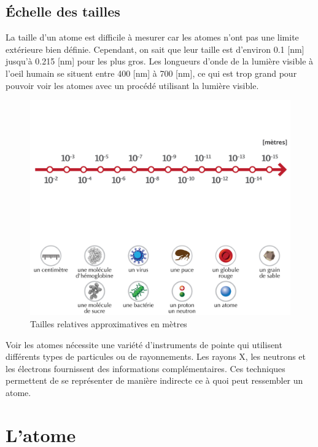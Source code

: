 \documentclass[
  11pt,
  a4paper,
  openany]{book}
\begin{document}
\hypertarget{uxe9chelle-des-tailles}{%
\section{Échelle des tailles}\label{uxe9chelle-des-tailles}}

La taille d'un atome est difficile à mesurer car les atomes n'ont pas une limite extérieure bien définie. Cependant, on sait que leur taille est d'environ 0.1 {[}nm{]} jusqu'à 0.215 {[}nm{]} pour les plus gros. Les longueurs d'onde de la lumière visible à l'oeil humain se situent entre 400 {[}nm{]} à 700 {[}nm{]}, ce qui est trop grand pour pouvoir voir les atomes avec un procédé utilisant la lumière visible.

\begin{figure}

{\centering \includegraphics[width=1\linewidth]{images/ordre-grandeur-ex} 

}

\caption{Tailles relatives approximatives en mètres}\label{fig:ordre-grandeur-ex}
\end{figure}

Voir les atomes nécessite une variété d'instruments de pointe qui utilisent différents types de particules ou de rayonnements. Les rayons X, les neutrons et les électrons fournissent des informations complémentaires. Ces techniques permettent de se représenter de manière indirecte ce à quoi peut ressembler un atome.

\hypertarget{latome}{%
\chapter{L'atome}\label{latome}}
\end{document}
